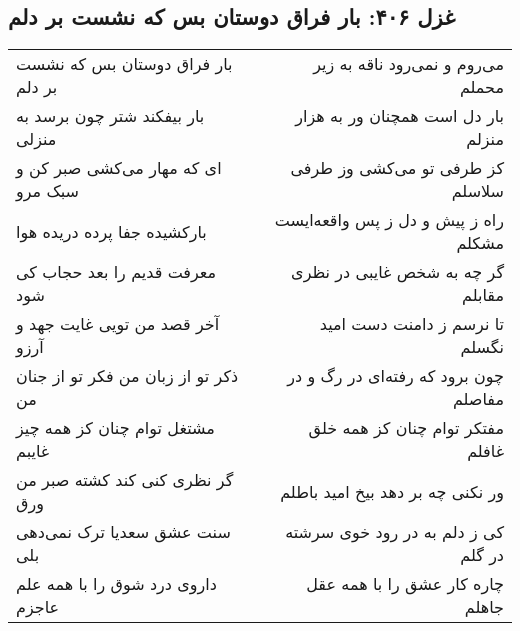 \begin{center}
\section*{غزل ۴۰۶: بار فراق دوستان بس که نشست بر دلم}
\label{sec:406}
\begin{longtable}{l p{0.5cm} r}
بار فراق دوستان بس که نشست بر دلم
&&
می‌روم و نمی‌رود ناقه به زیر محملم
\\
بار بیفکند شتر چون برسد به منزلی
&&
بار دل است همچنان ور به هزار منزلم
\\
ای که مهار می‌کشی صبر کن و سبک مرو
&&
کز طرفی تو می‌کشی وز طرفی سلاسلم
\\
بارکشیده جفا پرده دریده هوا
&&
راه ز پیش و دل ز پس واقعه‌ایست مشکلم
\\
معرفت قدیم را بعد حجاب کی شود
&&
گر چه به شخص غایبی در نظری مقابلم
\\
آخر قصد من تویی غایت جهد و آرزو
&&
تا نرسم ز دامنت دست امید نگسلم
\\
ذکر تو از زبان من فکر تو از جنان من
&&
چون برود که رفته‌ای در رگ و در مفاصلم
\\
مشتغل توام چنان کز همه چیز غایبم
&&
مفتکر توام چنان کز همه خلق غافلم
\\
گر نظری کنی کند کشته صبر من ورق
&&
ور نکنی چه بر دهد بیخ امید باطلم
\\
سنت عشق سعدیا ترک نمی‌دهی بلی
&&
کی ز دلم به در رود خوی سرشته در گلم
\\
داروی درد شوق را با همه علم عاجزم
&&
چاره کار عشق را با همه عقل جاهلم
\\
\end{longtable}
\end{center}
